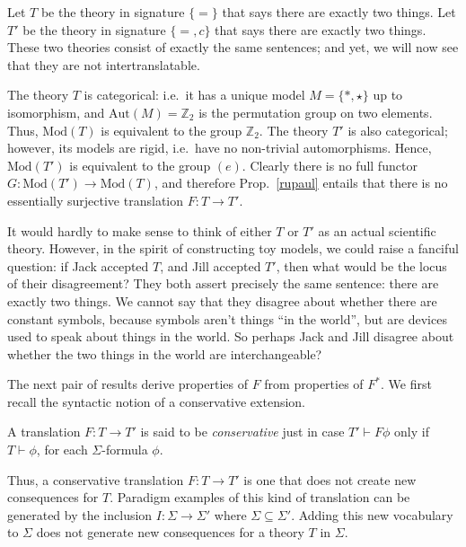 \begin{example} Let $T$ be the theory in signature $\{ =\}$ that says
  there are exactly two things.  Let $T'$ be the theory in signature
  $\{ =,c\}$ that says there are exactly two things.  These two
  theories consist of exactly the same sentences; and yet, we will now
  see that they are not intertranslatable.

  The theory $T$ is categorical: i.e.\ it has a unique model
  $M = \{ \ast ,\star \}$ up to isomorphism, and
  $\mathrm{Aut}(M)=\mathbb{Z}_2$ is the permutation group on two
  elements.  Thus, $\mathrm{Mod}(T)$ is equivalent to the group
  $\mathbb{Z}_2$.  The theory $T'$ is also categorical; however, its
  models are rigid, i.e.\ have no non-trivial automorphisms.  Hence,
  $\mathrm{Mod}(T')$ is equivalent to the group $(e)$.  Clearly there
  is no full functor $G:\mathrm{Mod}(T')\to \mathrm{Mod}(T)$, and
  therefore Prop.\ \ref{rupaul} entails that there is no essentially
  surjective translation $F:T\to T'$.



  It would hardly to make sense to think of either $T$ or $T'$ as an
  actual scientific theory.  However, in the spirit of constructing
  toy models, we could raise a fanciful question: if Jack accepted
  $T$, and Jill accepted $T'$, then what would be the locus of their
  disagreement?  They both assert precisely the same sentence: there
  are exactly two things.  We cannot say that they disagree about
  whether there are constant symbols, because symbols aren't things
  ``in the world'', but are devices used to speak about things in the
  world.  So perhaps Jack and Jill disagree about whether the two
  things in the world are interchangeable?
\end{example}

The next pair of results derive properties of $F$ from properties of
$F^*$.  We first recall the syntactic notion of a conservative
extension.

\begin{defn} A translation $F:T\to T'$ is said to be
  \emph{conservative} just in case $T'\vdash F\phi$ only if
  $T\vdash\phi$, for each $\Sigma$-formula $\phi$.  \end{defn}

Thus, a conservative translation $F:T\to T'$ is one that does not
create new consequences for $T$.  Paradigm examples of this kind of
translation can be generated by the inclusion $I:\Sigma\to\Sigma '$
where $\Sigma\subseteq \Sigma '$.  Adding this new vocabulary to
$\Sigma$ does not generate new consequences for a theory $T$ in
$\Sigma$.

